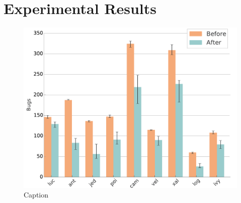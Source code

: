 \documentclass[conference]{IEEEtran}
\begin{document}
\section{Experimental Results}
\begin{figure}[!t]
\centering
\includegraphics[width=\linewidth]{_figs/histograms.pdf}
\caption{Caption}
\label{fig:bugs}
\end{figure}
\end{document}
